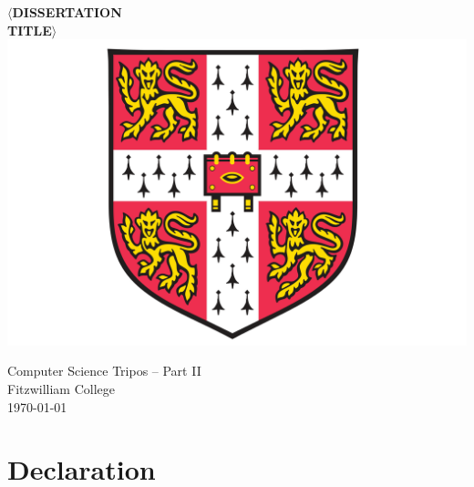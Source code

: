 \documentclass[12pt,a4paper,twoside,openright]{report}
\begin{document}



\pagestyle{empty}


\vspace*{30mm}
\begin{center}
	\Huge
	\textbf{\(\langle\)DISSERTATION \\ TITLE\(\rangle\) } \\[20mm]

	\vspace{-2mm}
	\includegraphics[scale=0.5]{./figures/crest.png}
	\hspace{0mm}\\[20mm]
	\vspace{2mm}


	\LARGE
	Computer Science Tripos -- Part II \\[1mm]
	Fitzwilliam College \\[20mm]

	\Large
	\today
\end{center}

\newpage
\thispagestyle{empty}


\pagestyle{plain}


\section*{Declaration}
\end{document}
